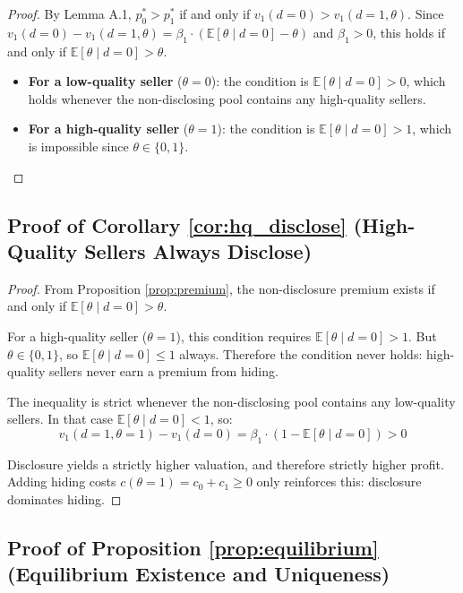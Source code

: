 \documentclass[10pt,letterpaper]{bp-template-concise}
\begin{document}
\begin{proof}
By Lemma A.1, $p^*_0 > p^*_1$ if and only if $v_1(d=0) > v_1(d=1, \theta)$. Since $v_1(d=0) - v_1(d=1, \theta) = \beta_1 \cdot (\mathbb{E}[\theta \mid d=0] - \theta)$ and $\beta_1 > 0$, this holds if and only if $\mathbb{E}[\theta \mid d=0] > \theta$.

\begin{itemize}
    \item \textbf{For a low-quality seller} ($\theta = 0$): the condition is $\mathbb{E}[\theta \mid d=0] > 0$, which holds whenever the non-disclosing pool contains any high-quality sellers.
    \item \textbf{For a high-quality seller} ($\theta = 1$): the condition is $\mathbb{E}[\theta \mid d=0] > 1$, which is impossible since $\theta \in \{0,1\}$.
\end{itemize}
\end{proof}

\subsection*{Proof of Corollary \ref{cor:hq_disclose} (High-Quality Sellers Always Disclose)}

\begin{proof}
From Proposition \ref{prop:premium}, the non-disclosure premium exists if and only if $\mathbb{E}[\theta \mid d=0] > \theta$.

For a high-quality seller ($\theta = 1$), this condition requires $\mathbb{E}[\theta \mid d=0] > 1$. But $\theta \in \{0, 1\}$, so $\mathbb{E}[\theta \mid d=0] \leq 1$ always. Therefore the condition never holds: high-quality sellers never earn a premium from hiding.

The inequality is strict whenever the non-disclosing pool contains any low-quality sellers. In that case $\mathbb{E}[\theta \mid d=0] < 1$, so:
\begin{equation}
    v_1(d=1, \theta=1) - v_1(d=0) = \beta_1 \cdot (1 - \mathbb{E}[\theta \mid d=0]) > 0
\end{equation}

Disclosure yields a strictly higher valuation, and therefore strictly higher profit. Adding hiding costs $c(\theta=1) = c_0 + c_1 \geq 0$ only reinforces this: disclosure dominates hiding.
\end{proof}

\subsection*{Proof of Proposition \ref{prop:equilibrium} (Equilibrium Existence and Uniqueness)}
\end{document}
